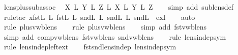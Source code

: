 \begin{isabellebody}
\isamarkupfalse%
%
\endisatagproof
{\isafoldproof}%
%
\isadelimproof
\isanewline
%
\endisadelimproof
\isanewline
{}\isamarkupfalse%
\ lens{\isacharunderscore}plus{\isacharunderscore}sub{\isacharunderscore}assoc{\isacharunderscore}{}{\isacharcolon}\isanewline
\ \ {\isachardoublequoteopen}{\isacharparenleft}X\ {\isacharplus}\isactrlsub L\ Y{\isacharparenright}\ {\isacharplus}\isactrlsub L\ Z\ {\isasymsubseteq}\isactrlsub L\ X\ {\isacharplus}\isactrlsub L\ Y\ {\isacharplus}\isactrlsub L\ Z{\isachardoublequoteclose}\isanewline
%
\isadelimproof
\ \ %
\endisadelimproof
%
\isatagproof
{}\isamarkupfalse%
\ {\isacharparenleft}simp\ add{\isacharcolon}\ sublens{\isacharunderscore}def{\isacharparenright}\isanewline
\ \ \isamarkupfalse%
\ {\isacharparenleft}rule{\isacharunderscore}tac\ x{\isacharequal}{\isachardoublequoteopen}{\isacharparenleft}fst\isactrlsub L\ {\isacharplus}\isactrlsub L\ {\isacharparenleft}fst\isactrlsub L\ {\isacharsemicolon}\isactrlsub L\ snd\isactrlsub L{\isacharparenright}{\isacharparenright}\ {\isacharplus}\isactrlsub L\ {\isacharparenleft}snd\isactrlsub L\ {\isacharsemicolon}\isactrlsub L\ snd\isactrlsub L{\isacharparenright}{\isachardoublequoteclose}\ \ exI{\isacharparenright}\isanewline
\ \ \isamarkupfalse%
\ {\isacharparenleft}auto{\isacharparenright}\isanewline
\ \ \isamarkupfalse%
\ {\isacharparenleft}rule\ plus{\isacharunderscore}vwb{\isacharunderscore}lens{\isacharparenright}\isanewline
\ \ \isamarkupfalse%
\ {\isacharparenleft}rule\ plus{\isacharunderscore}vwb{\isacharunderscore}lens{\isacharparenright}\isanewline
\ \ \isamarkupfalse%
\ {\isacharparenleft}simp\ add{\isacharcolon}\ fst{\isacharunderscore}vwb{\isacharunderscore}lens{\isacharparenright}\isanewline
\ \ \isamarkupfalse%
\ {\isacharparenleft}simp\ add{\isacharcolon}\ comp{\isacharunderscore}vwb{\isacharunderscore}lens\ fst{\isacharunderscore}vwb{\isacharunderscore}lens\ snd{\isacharunderscore}vwb{\isacharunderscore}lens{\isacharparenright}\isanewline
\ \ \isamarkupfalse%
\ {\isacharparenleft}rule\ lens{\isacharunderscore}indep{\isacharunderscore}sym{\isacharparenright}\isanewline
\ \ \isamarkupfalse%
\ {\isacharparenleft}rule\ lens{\isacharunderscore}indep{\isacharunderscore}left{\isacharunderscore}ext{\isacharparenright}\isanewline
\ \ \isamarkupfalse%
\ fst{\isacharunderscore}snd{\isacharunderscore}lens{\isacharunderscore}indep\ lens{\isacharunderscore}indep{\isacharunderscore}sym\ \isamarkupfalse%

\end{isabellebody}
